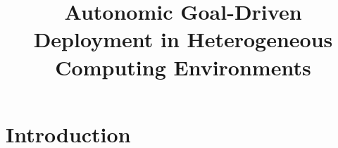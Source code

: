 \documentclass[mestrado]{pacotes/unb-cic}
\title{Autonomic Goal-Driven Deployment in Heterogeneous Computing Environments}
\begin{document}
\maketitle

\pretextual



\begin{abstract}%

  




\end{abstract}

\tableofcontents
\listoffigures

\textual

\chapter{Introduction}
\label{chap:introduction}
\end{document}
